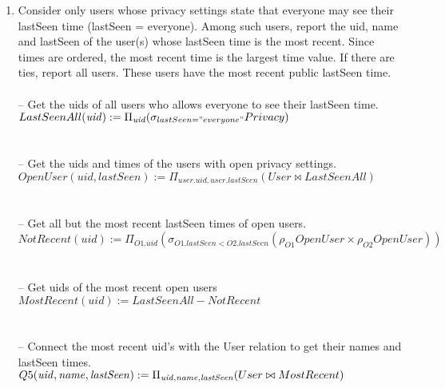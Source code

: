 \documentclass{article}
\newcommand{\var}[1]{\mathit{#1}}
\begin{document}
\begin{enumerate}
\item   %
Consider only users whose privacy settings state that everyone may see their lastSeen time (lastSeen = everyone). Among such users, report the uid, name and lastSeen of the user(s) whose lastSeen time is the most recent. Since times are ordered, the most recent time is the largest time value. If there are ties, report all users. These users have the most recent public lastSeen time. \\\\ [5pt]
{\large
\hspace*{1cm} -- Get the uids of all users who allows everyone to see their lastSeen time. \\ [5pt]
$
LastSeenAll(\var{uid}) :=
	\Pi_{\var{\var{uid}}}
	(\sigma_{lastSeen = "everyone"} Privacy)
$ \\\\\\
\hspace*{1cm} -- Get the uids and times of the users with open privacy settings. \\ [5pt]
$
OpenUser(uid, lastSeen) := 
	\Pi_{user.uid, user.lastSeen}
	(User \bowtie LastSeenAll)
$\\\\\\
\hspace*{1cm} -- Get all but the most recent lastSeen times of open users. \\ [5pt]
$
NotRecent(\var{uid}) := \Pi_{\var{O1.uid}}
	(\sigma_{O1.\var{lastSeen} < O2.\var{lastSeen}}
	(\rho_{O1}OpenUser \times \rho_{O2}OpenUser))
$\\\\\\
\hspace*{1cm} -- Get uids of the most recent open users \\ [5pt]
$
MostRecent(\var{uid}) := LastSeenAll - NotRecent
$\\\\\\
\hspace*{1cm} -- Connect the most recent uid's with the User relation to get their names and lastSeen times. \\ [5pt]
$
Q5(\var{uid}, \var{name}, \var{lastSeen}) := 
	\Pi_{\var{uid}, \var{name}, \var{lastSeen}} 
	(User \bowtie MostRecent) \\ 
$
}


\end{enumerate}
\end{document}
